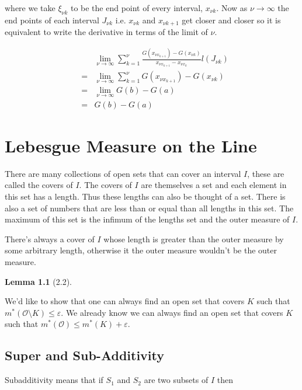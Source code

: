 \documentclass[oneside]{book}
\newtheorem{lemma}[theorem]{Lemma}
\newenvironment{proof}[1][Proof]{\begin{trivlist}
\item[\hskip \labelsep {\bfseries #1}]}{\end{trivlist}}
\begin{document}
\begin{enumerate}
where we take $\xi_{\nu k}$ to be the end point of every interval, $x_{\nu k}$. Now as $\nu \to \infty$ the end points of each interval $J_{\nu k}$ i.e. $x_{\nu k}$ and $x_{\nu k+1}$ get closer and closer so it is equivalent to write the derivative in terms of the limit of $\nu$.

\begin{eqnarray}
&&\lim_{\nu \to \infty} \sum_{k=1}^\nu \frac{G(x_{\nu x_{k+1}})-G(x_{\nu k})}{x_{\nu x_{k+1}}-x_{\nu x_{k}}} l(J_{\nu k}) \nonumber \\
&=& \lim_{\nu \to \infty} \sum_{k=1}^\nu G(x_{\nu x_{k+1}})-G(x_{\nu k}) \nonumber \\
&=& \lim_{\nu \to \infty} G(b) - G(a) \nonumber \\
&=& G(b) - G(a)
\end{eqnarray}

\end{enumerate}
\chapter{Lebesgue Measure on the Line}

There are many collections of open sets that can cover an interval $I$, these are called the covers of $I$. The covers of $I$ are themselves a set and each element in this set has a length. Thus these lengths can also be thought of a set. There is also a set of numbers that are less than or equal than all lengths in this set. The maximum of this set is the infimum of the lengths set and the outer measure of $I$.

There's always a cover of $I$ whose length is greater than the outer measure by some arbitrary length, otherwise it the outer measure wouldn't be the outer measure. 

\begin{lemma}[2.2]

\end{lemma}

\begin{proof}
We'd like to show that one can always find an open set that covers $K$ such that $m^*(\mathcal{O} \setminus K) \le \varepsilon$. We already know we can always find an open set that covers $K$ such that $m^*(\mathcal{O}) \le m^*(K) + \varepsilon$.
\end{proof}

\section{Super and Sub-Additivity}
Subadditivity means that if $S_1$ and $S_2$ are two subsets of $I$ then
\end{document}
